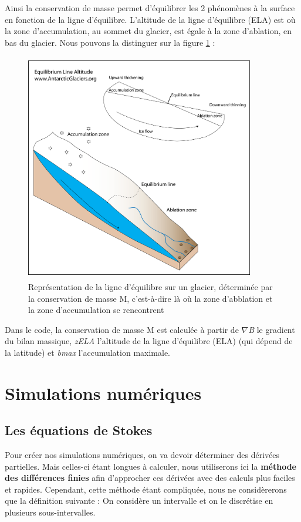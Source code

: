 \documentclass{article}
\begin{document}
Ainsi la conservation de masse permet d'équilibrer les 2 phénomènes à la surface en fonction de la ligne d'équilibre. L'altitude de la ligne d'équilibre (ELA) est où la zone d'accumulation, au sommet du glacier, est égale à la zone d'ablation, en bas du glacier. Nous pouvons la distinguer sur la figure \ref{fig02} : 

\begin{figure}[!htpb]
\centering
\includegraphics[width=10cm, keepaspectratio=true, height=10cm]{equilibrium_line_altitude1.png}
\caption{Représentation de la ligne d'équilibre sur un glacier, déterminée par la conservation de masse M, c'est-à-dire là où la zone d'abblation et la zone d'accumulation se rencontrent}
\label{fig02}
\end{figure}



Dans le code, la conservation de masse M est calculée à partir de $ \nabla$\textit{B} le gradient du bilan massique, \textit{zELA} l'altitude de la ligne d'équilibre (ELA) (qui dépend de la latitude) et \textit{bmax} l'accumulation maximale.
\newpage
\section{Simulations numériques}

\subsection{Les équations de Stokes}
Pour créer nos simulations numériques, on va devoir déterminer des dérivées partielles. Mais celles-ci étant longues à calculer, nous utiliserons ici la \textbf{méthode des différences finies} afin d'approcher ces dérivées avec des calculs plus faciles et rapides.
\newline
Cependant, cette méthode étant compliquée, nous ne considèrerons que la définition suivante : On considère un intervalle et on le discrétise en plusieurs sous-intervalles.
\end{document}
